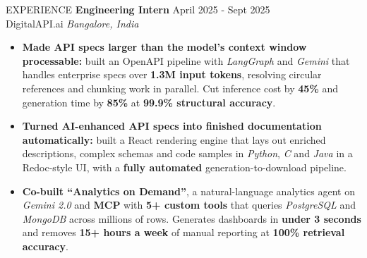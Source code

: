 \documentclass{resume} %
\begin{document}
\begin{rSection}{EXPERIENCE}
\textbf{Engineering Intern} \hfill April 2025 - Sept 2025\\
DigitalAPI.ai \hfill \textit{Bangalore, India}
 \begin{itemize}
    \itemsep -3pt {} 
     \item \textbf{Made API specs larger than the model's context window processable:} built an OpenAPI pipeline with \textit{LangGraph} and \textit{Gemini} that handles enterprise specs over \textbf{1.3M input tokens}, resolving circular references and chunking work in parallel. Cut inference cost by \textbf{45\%} and generation time by \textbf{85\%} at \textbf{99.9\% structural accuracy}.
     \item \textbf{Turned AI-enhanced API specs into finished documentation automatically:} built a React rendering engine that lays out enriched descriptions, complex schemas and code samples in \textit{Python}, \textit{C} and \textit{Java} in a Redoc-style UI, with a \textbf{fully automated} generation-to-download pipeline.
     \item \textbf{Co-built ``Analytics on Demand''}, a natural-language analytics agent on \textit{Gemini 2.0} and \textbf{MCP} with \textbf{5+ custom tools} that queries \textit{PostgreSQL} and \textit{MongoDB} across millions of rows. Generates dashboards in \textbf{under 3 seconds} and removes \textbf{15+ hours a week} of manual reporting at \textbf{100\% retrieval accuracy}.
 \end{itemize}

\end{rSection}

\end{document}
